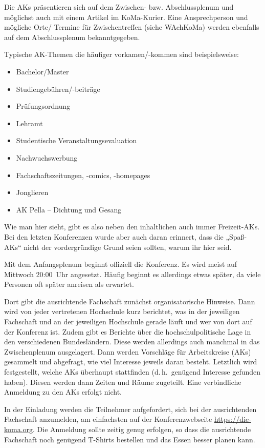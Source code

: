\documentclass{neulingsheft}
\begin{document}
{\begin{description}
	Die AKs präsentieren sich auf dem Zwischen- bzw. Abschlussplenum und möglichst
	auch mit einem Artikel im KoMa-Kurier. Eine Ansprechperson und mögliche
	Orte/ Termine für Zwischentreffen (siehe WAchKoMa) werden ebenfalls auf
	dem Abschlussplenum bekanntgegeben.

	Typische AK-Themen die häufiger vorkamen/-kommen sind beispielsweise:
	\begin{itemize}
		\item Bachelor/Master
		\item Studiengebühren/-beiträge
		\item Prüfungsordnung
		\item Lehramt
		\item Studentische Veranstaltungsevaluation
		\item Nachwuchswerbung
		\item Fachschaftszeitungen, -comics, -homepages
		\item Jonglieren
		\item AK Pella – Dichtung und Gesang
	\end{itemize}
	Wie man hier sieht, gibt es also neben den inhaltlichen auch immer
	Freizeit-AKs. Bei den letzten Konferenzen wurde aber auch daran
	erinnert, dass die „Spaß-AKs“ nicht der vordergründige Grund seien
	sollten, warum ihr hier seid.

\item[Anfangsplenum] Mit dem Anfangsplenum beginnt offiziell die Konferenz. Es
	wird meist auf Mittwoch 20:00~Uhr angesetzt.  Häufig beginnt es allerdings
	etwas später, da viele Personen oft später anreisen als erwartet.

	Dort gibt die ausrichtende Fachschaft zunächst organisatorische Hinweise. Dann
	wird von jeder vertretenen Hochschule kurz berichtet, was in der
	jeweiligen Fachschaft und an der jeweiligen Hochschule gerade läuft und
	wer von dort auf der Konferenz ist. Zudem gibt es Berichte über die
	hochschulpolitische Lage in den verschiedenen Bundesländern. Diese
	werden allerdings auch manchmal in das Zwischenplenum ausgelagert. Dann
	werden Vorschläge für Arbeitskreise (AKs) gesammelt und abgefragt, wie
	viel Interesse jeweils daran besteht. Letztlich wird festgestellt,
	welche AKs überhaupt stattfinden (d.\,h.\ genügend Interesse gefunden
	haben). Diesen werden dann Zeiten und Räume zugeteilt. Eine
	verbindliche Anmeldung zu den AKs erfolgt nicht.

\item[Anmeldung] In der Einladung werden die Teilnehmer aufgefordert, sich bei
	der ausrichtenden Fachschaft anzumelden, am einfachsten auf der
	Konferenzwebseite \url{https://die-koma.org}. Die Anmeldung sollte zeitig
	genug erfolgen, so dass die ausrichtende Fachschaft noch genügend T-Shirts
	bestellen und das Essen besser planen kann.


\end{description}}
\end{document}
